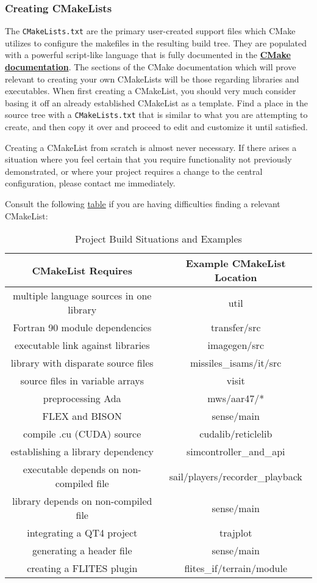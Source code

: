 \documentclass[12pt,letterpaper]{article}
\begin{document}
\subsubsection{Creating CMakeLists}

The \verb|CMakeLists.txt| are the primary user-created support files which CMake utilizes to configure the makefiles in the resulting build tree.  They are populated with a powerful script-like language that is fully documented in the \linebreak\hyperlink{cmakedoc}{\textbf{CMake documentation}}.  The sections of the CMake documentation which will prove relevant to creating your own CMakeLists will be those regarding libraries and executables.  When first creating a CMakeList, you should very much consider basing it off an already established CMakeList as a template.  Find a place in the source tree with a \verb|CMakeLists.txt| that is similar to what you are attempting to create, and then copy it over and proceed to edit and customize it until satisfied.

Creating a CMakeList from scratch is almost never necessary.  If there arises a situation where you feel certain that you require functionality not previously demonstrated, or where your project requires a change to the central configuration, please contact me immediately.

Consult the following \hyperlink{cmakelisttable}{table} if you are having difficulties finding a relevant CMakeList:

\begin{table}[h]
\centering
\caption{Project Build Situations and Examples}\hypertarget{cmakelisttable}{}
\begin{tabular}{| c | c |}
CMakeList Requires & Example CMakeList Location\\
\hline
multiple language sources in one library & util\\
Fortran 90 module dependencies & transfer/src\\
executable link against libraries & imagegen/src\\
library with disparate source files & missiles\_isams/it/src\\
source files in variable arrays & visit\\
preprocessing Ada & mws/aar47/*\\
FLEX and BISON & sense/main\\
compile .cu (CUDA) source & cudalib/reticlelib\\
establishing a library dependency & simcontroller\_and\_api\\
executable depends on non-compiled file & sail/players/recorder\_playback\\
library depends on non-compiled file & sense/main\\
integrating a QT4 project & trajplot\\
generating a header file & sense/main\\
creating a FLITES plugin & flites\_if/terrain/module\\
\end{tabular}
\end{table}
\end{document}
